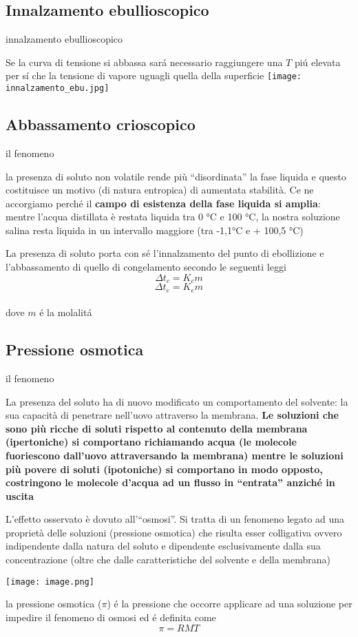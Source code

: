 \documentclass[a4paper]{article}
\newcommand{\question}[1]{%
    \begin{tcolorbox}[colback=red!05,colframe=red!25,sidebyside align=top,width=\linewidth,before skip=1ex]
        #1
        
    \end{tcolorbox}%
    \switchcolumn %
}
\newcommand{\note}[1]{%
    \begin{tcolorbox}[colback=blue!05,colframe=blue!10,width=\linewidth,before skip=1ex]
        #1
    \end{tcolorbox}         
}
\newcommand{\summary}[2][]{%
\begin{minipage}[b]{\textwidth}
    \vspace*{\baselineskip}
    \begin{tcolorbox}[colframe=green!50!blue!80,fonttitle=\large\bfseries\sffamily,
        after skip = \baselineskip,
        title=Riassunto]
        #2
    \end{tcolorbox}
\end{minipage}
#1}
\begin{document}
\subsection{Innalzamento ebullioscopico}
\begin{paracol}{2}
    \question{innalzamento ebullioscopico}
    \note{Se la curva di tensione si abbassa sará necessario raggiungere una $T$ piú elevata per sí che la tensione di vapore uguagli quella della superficie \texttt{[image: innalzamento\_ebu.jpg]}
    }
  
\end{paracol}
\subsection{Abbassamento crioscopico}
\begin{paracol}{2}
    \question{il fenomeno}
    \note{ la  presenza di soluto non volatile rende più “disordinata” la fase liquida e questo costituisce un motivo (di natura entropica) di aumentata stabilità. Ce ne accorgiamo perché il \textbf{campo di esistenza della fase liquida si amplia}: mentre l’acqua distillata è restata liquida tra 0 °C e 100 °C, la nostra soluzione salina resta liquida in un intervallo maggiore   (tra -1,1°C e + 100,5 °C)}
\end{paracol}
\summary[\clearpage]{La presenza di soluto porta con sé l'innalzamento del punto di ebollizione e l'abbassamento di quello di congelamento secondo le seguenti leggi $$\Delta t_c=K_cm$$ $$\Delta t_e=K_em$$ \\ dove $m$ é la molalitá
}
\subsection{Pressione osmotica}
\begin{paracol}{2}
    \question{il fenomeno}
    \note{    La presenza del soluto  ha di nuovo modificato un comportamento del solvente: la sua capacità di penetrare nell’uovo attraverso la membrana. \textbf{Le soluzioni che sono più ricche di soluti rispetto al contenuto della membrana (ipertoniche) si comportano richiamando acqua (le molecole fuoriescono dall’uovo attraversando la membrana) mentre le soluzioni più povere di soluti (ipotoniche) si comportano in modo opposto, costringono le molecole d’acqua ad un flusso in “entrata” anziché in uscita}}
    
    \note{L’effetto osservato  è dovuto all'“osmosi”. Si tratta di un fenomeno legato ad una proprietà delle soluzioni (pressione osmotica) che risulta esser colligativa ovvero indipendente dalla natura del soluto e dipendente esclusivamente dalla sua concentrazione (oltre che dalle caratteristiche del solvente e della membrana)}
    \note{
    \texttt{[image: image.png]}}
    
\end{paracol}
    \summary{la pressione osmotica ($\pi$) é la pressione che occorre applicare ad una soluzione per impedire il fenomeno di osmosi ed é definita come $$\pi=RMT$$ }
\end{document}
